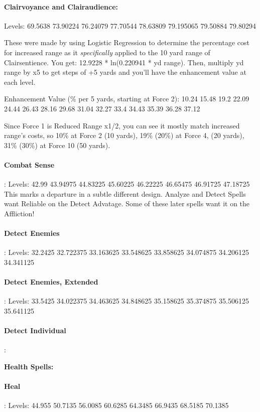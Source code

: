 \begin{multicols*}{2}
		
	\paragraph{Clairvoyance and Clairaudience: } Levels: 69.5638 73.90224 76.24079 77.70544 78.63809 79.195065 79.50884 79.80294
	
	These were made by using Logistic Regression to determine the percentage cost for increased range as it \textit{specifically} applied to the 10 yard range of Clairsentience. You get: 12.9228 * ln(0.220941 * yd range). Then, multiply yd range by x5 to get steps of +5 yards and you'll have the enhancement value at each level.
	
	Enhancement Value (\% per 5 yards, starting at Force 2): 10.24 15.48 19.2 22.09 24.44 26.43 28.16 29.68 31.04 32.27 33.4 34.43 35.39 36.28 37.12
	
	Since Force 1 is Reduced Range x1/2, you can see it mostly match increased range's costs, so 10\% at Force 2 (10 yards), 19\% (20\%) at Force 4, (20 yards), 31\% (30\%) at Force 10 (50 yards).
	
	\paragraph{Combat Sense}: Levels: 42.99 43.94975 44.83225 45.60225 46.22225 46.65475 46.91725 47.18725
	This marks a departure in a subtle different design. Analyze and Detect Spells want Reliable on the Detect Advatage. Some of these later spells want it on the Affliction!
	
	\paragraph{Detect Enemies}: Levels: 32.2425 32.722375 33.163625 33.548625 33.858625 34.074875 34.206125 34.341125
	
	\paragraph{Detect Enemies, Extended}: Levels: 33.5425 34.022375 34.463625 34.848625 35.158625 35.374875 35.506125 35.641125
	
	\paragraph{Detect Individual}:
	
	\textbf{Health Spells:\\}
	
	\paragraph{Heal}: Levels: 44.955 50.7135 56.0085 60.6285 64.3485 66.9435 68.5185 70.1385
	

\end{multicols*}

